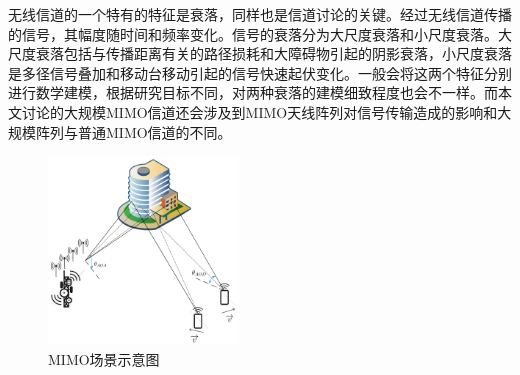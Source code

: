 \documentclass[bachelor,nocolorlinks, printoneside]{seuthesis} %
\begin{document}
\begin{Main}
无线信道的一个特有的特征是衰落，同样也是信道讨论的关键。经过无线信道传播的信号，其幅度随时间和频率变化。信号的衰落分为大尺度衰落和小尺度衰落。大尺度衰落包括与传播距离有关的路径损耗和大障碍物引起的阴影衰落，小尺度衰落是多径信号叠加和移动台移动引起的信号快速起伏变化。一般会将这两个特征分别进行数学建模，根据研究目标不同，对两种衰落的建模细致程度也会不一样。而本文讨论的大规模MIMO信道还会涉及到MIMO天线阵列对信号传输造成的影响和大规模阵列与普通MIMO信道的不同。


\begin{figure}[htbp!]
	\centering \includegraphics[width=0.45\textwidth]{img/2_1.png} \caption{MIMO场景示意图}
\end{figure}


\end{Main}
\end{document}

